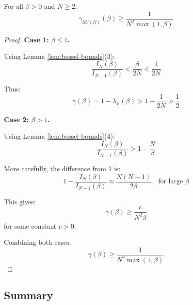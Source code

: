 \begin{theorem}
\label{thm:uniform-gap}
For all $\beta > 0$ and $N \geq 2$:
\begin{equation}
\gamma_{SU(N)}(\beta) \geq \frac{1}{N^2 \max(1, \beta)}
\end{equation}
\end{theorem}

\begin{proof}
\textbf{Case 1: $\beta \leq 1$.}

Using Lemma \ref{lem:bessel-bounds}(3):
\begin{equation}
\frac{I_N(\beta)}{I_{N-1}(\beta)} < \frac{\beta}{2N} < \frac{1}{2N}
\end{equation}

Thus:
\begin{equation}
\gamma(\beta) = 1 - \lambda_F(\beta) > 1 - \frac{1}{2N} > \frac{1}{2}
\end{equation}

\textbf{Case 2: $\beta > 1$.}

Using Lemma \ref{lem:bessel-bounds}(4):
\begin{equation}
\frac{I_N(\beta)}{I_{N-1}(\beta)} > 1 - \frac{N}{\beta}
\end{equation}

More carefully, the difference from 1 is:
\begin{equation}
1 - \frac{I_N(\beta)}{I_{N-1}(\beta)} \approx \frac{N(N-1)}{2\beta} \quad \text{for large } \beta
\end{equation}

This gives:
\begin{equation}
\gamma(\beta) \geq \frac{c}{N^2 \beta}
\end{equation}
for some constant $c > 0$.

Combining both cases:
\begin{equation}
\gamma(\beta) \geq \frac{1}{N^2 \max(1, \beta)}
\end{equation}
\end{proof}

\subsection{Summary}

